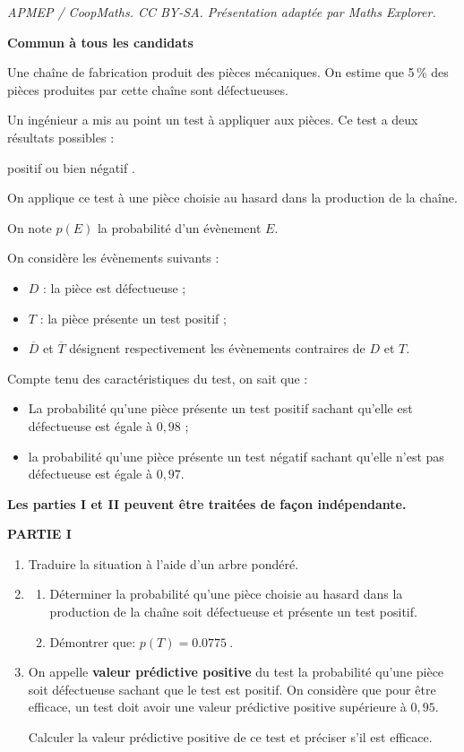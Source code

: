 \documentclass[10pt]{article}
\providecommand{\np}[2][]{{#2~#1}}
\begin{document}
\noindent\textit{APMEP / CoopMaths. CC BY-SA. Présentation adaptée par Maths Explorer.}\par\medskip
\textbf{Commun à tous les candidats}
\medskip

Une chaîne de fabrication produit des pièces mécaniques. On estime que 5\,\% des pièces
produites par cette chaîne sont défectueuses.

Un ingénieur a mis au point un test à appliquer aux pièces. Ce test a deux résultats possibles :

\og positif \fg{} ou bien \og négatif \fg.

On applique ce test à une pièce choisie au hasard dans la production de la chaîne.

On note $p(E)$ la probabilité d'un évènement $E$.

On considère les évènements suivants :

\begin{itemize}
\item $D$ : \og la pièce est défectueuse \fg{} ;
\item $T$ : \og la pièce présente un test positif \fg {};
\item $\overline{D}$ et $\overline{T}$ désignent respectivement les évènements contraires de $D$ et $T$.
\end{itemize}

Compte tenu des caractéristiques du test, on sait que :
\begin{itemize}
\item La probabilité qu'une pièce présente un test positif sachant qu'elle est défectueuse est égale à $0,98$ ;
\item la probabilité qu'une pièce présente un test négatif sachant qu'elle n'est pas
défectueuse est égale à $0,97$.
\end{itemize}
\medskip
\begin{center}
\textbf{Les parties I et II peuvent être traitées de façon indépendante.}
\end{center}

\medskip

\textbf{PARTIE I}

\medskip

\begin{enumerate}
\item Traduire la situation à l'aide d'un arbre pondéré.
\item \begin{enumerate}
\item Déterminer la probabilité qu'une pièce choisie au hasard dans la production de la
chaîne soit défectueuse et présente un test positif.
\item Démontrer que: $p(T) = \np{0.0775}$.
\end{enumerate}
\item On appelle \textbf{valeur prédictive positive} du test la probabilité qu'une pièce soit
défectueuse sachant que le test est positif. On considère que pour être efficace, un
test doit avoir une valeur prédictive positive supérieure à $0,95$.

Calculer la valeur prédictive positive de ce test et préciser s'il est efficace.
\end{enumerate}
\medskip
\end{document}
